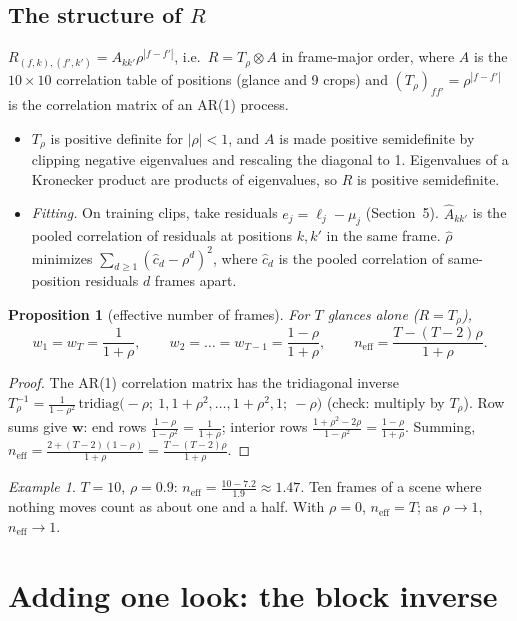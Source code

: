 \documentclass[11pt]{article}
\theoremstyle{plain}
\newtheorem{prop}{Proposition}
\theoremstyle{remark}
\newtheorem*{ex}{Example}
\begin{document}
\subsection{\texorpdfstring{The structure of $R$}{The structure of R}}
$R_{(f,k),(f',k')}=A_{kk'}\rho^{|f-f'|}$, i.e.\ $R=T_\rho\otimes A$ in frame-major order, where $A$ is the $10\times10$ correlation table of positions (glance and 9 crops) and $(T_\rho)_{ff'}=\rho^{|f-f'|}$ is the correlation matrix of an AR(1) process.
\begin{itemize}
  \item $T_\rho$ is positive definite for $|\rho|<1$, and $A$ is made positive semidefinite by clipping negative eigenvalues and rescaling the diagonal to 1. Eigenvalues of a Kronecker product are products of eigenvalues, so $R$ is positive semidefinite.
  \item \emph{Fitting.} On training clips, take residuals $e_j=\ell_j-\mu_j$ (Section~5). $\hat A_{kk'}$ is the pooled correlation of residuals at positions $k,k'$ in the same frame. $\hat\rho$ minimizes $\sum_{d\ge1}(\hat c_d-\rho^d)^2$, where $\hat c_d$ is the pooled correlation of same-position residuals $d$ frames apart.
\end{itemize}

\begin{prop}[effective number of frames]\label{prop:ar1}
For $T$ glances alone ($R=T_\rho$),
\[ w_1=w_T=\frac{1}{1+\rho},\qquad w_2=\dots=w_{T-1}=\frac{1-\rho}{1+\rho},\qquad n_{\text{eff}}=\frac{T-(T-2)\rho}{1+\rho}. \]
\end{prop}
\begin{proof}
The AR(1) correlation matrix has the tridiagonal inverse $T_\rho^{-1}=\frac{1}{1-\rho^2}\,\mathrm{tridiag}\big(-\rho;\ 1,1+\rho^2,\dots,1+\rho^2,1;\ -\rho\big)$ (check: multiply by $T_\rho$). Row sums give $\bm w$: end rows $\frac{1-\rho}{1-\rho^2}=\frac{1}{1+\rho}$; interior rows $\frac{1+\rho^2-2\rho}{1-\rho^2}=\frac{1-\rho}{1+\rho}$. Summing, $n_{\text{eff}}=\frac{2+(T-2)(1-\rho)}{1+\rho}=\frac{T-(T-2)\rho}{1+\rho}$.
\end{proof}

\begin{ex}
$T=10$, $\rho=0.9$: $n_{\text{eff}}=\frac{10-7.2}{1.9}\approx1.47$. Ten frames of a scene where nothing moves count as about one and a half. With $\rho=0$, $n_{\text{eff}}=T$; as $\rho\to1$, $n_{\text{eff}}\to1$.
\end{ex}

\section{Adding one look: the block inverse}
\end{document}
